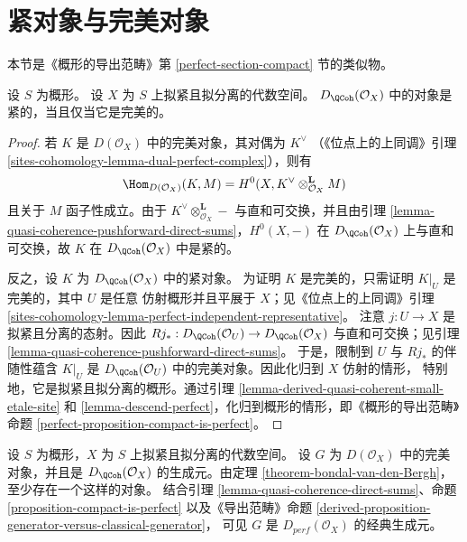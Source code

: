 \section{紧对象与完美对象}
\label{section-compact}

\noindent
本节是《概形的导出范畴》第 \ref{perfect-section-compact} 节的类似物。

\begin{proposition}
\label{proposition-compact-is-perfect}
设 $S$ 为概形。
设 $X$ 为 $S$ 上拟紧且拟分离的代数空间。
$D_\QCoh(\mathcal{O}_X)$ 中的对象是紧的，当且仅当它是完美的。
\end{proposition}

\begin{proof}
若 $K$ 是 $D(\mathcal{O}_X)$ 中的完美对象，其对偶为 $K^\vee$
（《位点上的上同调》引理
\ref{sites-cohomology-lemma-dual-perfect-complex}），则有
$$
\Hom_{D(\mathcal{O}_X)}(K, M) =
H^0(X, K^\vee \otimes_{\mathcal{O}_X}^\mathbf{L} M)
$$
且关于 $M$ 函子性成立。由于 $K^\vee \otimes_{\mathcal{O}_X}^\mathbf{L} -$
与直和可交换，并且由引理
\ref{lemma-quasi-coherence-pushforward-direct-sums}，$H^0(X, -)$ 在
$D_\QCoh(\mathcal{O}_X)$ 上与直和可交换，故 $K$ 在
$D_\QCoh(\mathcal{O}_X)$ 中是紧的。

\medskip\noindent
反之，设 $K$ 为 $D_\QCoh(\mathcal{O}_X)$ 中的紧对象。
为证明 $K$ 是完美的，只需证明 $K|_U$ 是完美的，其中 $U$ 是任意
仿射概形并且平展于 $X$；见《位点上的上同调》引理
\ref{sites-cohomology-lemma-perfect-independent-representative}。
注意 $j : U \to X$ 是拟紧且分离的态射。因此
$Rj_* : D_\QCoh(\mathcal{O}_U) \to D_\QCoh(\mathcal{O}_X)$
与直和可交换；见引理
\ref{lemma-quasi-coherence-pushforward-direct-sums}。
于是，限制到 $U$ 与 $Rj_*$ 的伴随性蕴含 $K|_U$ 是
$D_\QCoh(\mathcal{O}_U)$ 中的完美对象。因此化归到 $X$ 仿射的情形，
特别地，它是拟紧且拟分离的概形。通过引理
\ref{lemma-derived-quasi-coherent-small-etale-site} 和
\ref{lemma-descend-perfect}，化归到概形的情形，即《概形的导出范畴》命题
\ref{perfect-proposition-compact-is-perfect}。
\end{proof}

\begin{remark}
\label{remark-classical-generator}
设 $S$ 为概形，$X$ 为 $S$ 上拟紧且拟分离的代数空间。
设 $G$ 为 $D(\mathcal{O}_X)$ 中的完美对象，并且是
$D_\QCoh(\mathcal{O}_X)$ 的生成元。由定理
\ref{theorem-bondal-van-den-Bergh}，至少存在一个这样的对象。
结合引理 \ref{lemma-quasi-coherence-direct-sums}、命题
\ref{proposition-compact-is-perfect} 以及《导出范畴》命题
\ref{derived-proposition-generator-versus-classical-generator}，
可见 $G$ 是 $D_{perf}(\mathcal{O}_X)$ 的经典生成元。
\end{remark}

